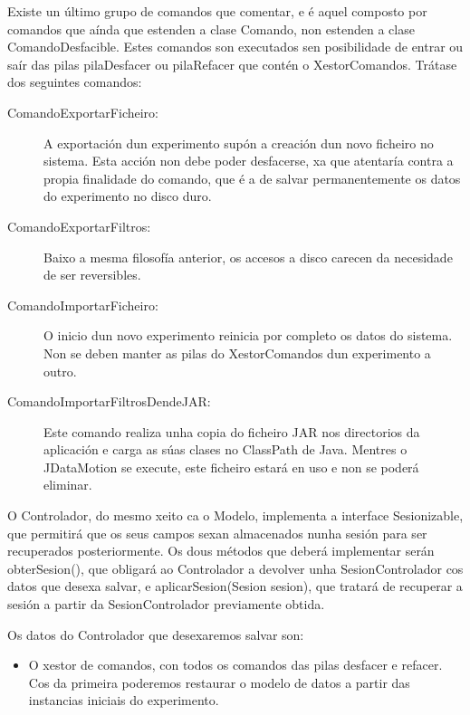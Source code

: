 Existe un último grupo de comandos que comentar, e é aquel composto por comandos que aínda que estenden a clase Comando, non estenden a clase ComandoDesfacible. Estes comandos son executados sen posibilidade de entrar ou saír das pilas pilaDesfacer ou pilaRefacer que contén o XestorComandos. Trátase dos seguintes comandos:

\begin{description}

\item[ComandoExportarFicheiro:]

A exportación dun experimento supón a creación dun novo ficheiro no sistema. Esta acción non debe poder desfacerse, xa que atentaría contra a propia finalidade do comando, que é a de salvar permanentemente os datos do experimento no disco duro.

\item[ComandoExportarFiltros:]

Baixo a mesma filosofía anterior, os accesos a disco carecen da necesidade de ser reversibles.

\item[ComandoImportarFicheiro:]

O inicio dun novo experimento reinicia por completo os datos do sistema. Non se deben manter as pilas do XestorComandos dun experimento a outro.

\item[ComandoImportarFiltrosDendeJAR:]

Este comando realiza unha copia do ficheiro JAR nos directorios da aplicación e carga as súas clases no ClassPath de Java. Mentres o JDataMotion se execute, este ficheiro estará en uso e non se poderá eliminar.

\end{description}

O Controlador, do mesmo xeito ca o Modelo, implementa a interface Sesionizable, que permitirá que os seus campos sexan almacenados nunha sesión para ser recuperados posteriormente. Os dous métodos que deberá implementar serán obterSesion(), que obligará ao Controlador a devolver unha SesionControlador cos datos que desexa salvar, e aplicarSesion(Sesion sesion), que tratará de recuperar a sesión a partir da SesionControlador previamente obtida.

Os datos do Controlador que desexaremos salvar son:

\begin{itemize}
\item O xestor de comandos, con todos os comandos das pilas desfacer e refacer. Cos da primeira poderemos restaurar o modelo de datos a partir das instancias iniciais do experimento.
\end{itemize}

